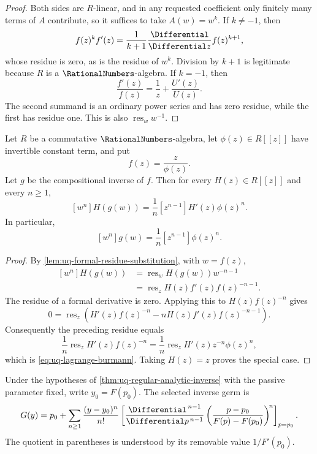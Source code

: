 \begin{proof}
Both sides are \(R\)-linear, and in any requested coefficient only finitely
many terms of \(A\) contribute, so it suffices to take \(A(w)=w^k\).
If \(k\ne-1\), then
\[
 f(z)^kf'(z)=\frac1{k+1}\frac{\Differential}{\Differential z}f(z)^{k+1},
\]
whose residue is zero, as is the residue of \(w^k\).  Division by \(k+1\)
is legitimate because \(R\) is a \(\RationalNumbers\)-algebra.  If \(k=-1\), then
\[
 \frac{f'(z)}{f(z)}=\frac1z+\frac{U'(z)}{U(z)}.
\]
The second summand is an ordinary power series and has zero residue, while
the first has residue one.  This is also
\(\operatorname{res}_w w^{-1}\).
\end{proof}

\begin{theorem}
\label{thm:uq-formal-lagrange-burmann}
Let \(R\) be a commutative \(\RationalNumbers\)-algebra, let
\(\phi(z)\in R[[z]]\) have invertible constant term, and put
\[
 f(z)=\frac{z}{\phi(z)}.
\]
Let \(g\) be the compositional inverse of \(f\).  Then for every
\(H(z)\in R[[z]]\) and every \(n\ge1\),
\begin{equation}
\label{eq:uq-lagrange-burmann}
 [w^n]H(g(w))
 =\frac1n[z^{n-1}]H'(z)\phi(z)^n.
\end{equation}
In particular,
\[
 [w^n]g(w)=\frac1n[z^{n-1}]\phi(z)^n.
\]
\end{theorem}

\begin{proof}
By \cref{lem:uq-formal-residue-substitution}, with \(w=f(z)\),
\[
\begin{aligned}
 [w^n]H(g(w))
 &=\operatorname{res}_w H(g(w))w^{-n-1}\\
 &=\operatorname{res}_z H(z)f'(z)f(z)^{-n-1}.
\end{aligned}
\]
The residue of a formal derivative is zero.  Applying this to
\(H(z)f(z)^{-n}\) gives
\[
 0=\operatorname{res}_z\!\left(
 H'(z)f(z)^{-n}-nH(z)f'(z)f(z)^{-n-1}\right).
\]
Consequently the preceding residue equals
\[
 \frac1n\operatorname{res}_z H'(z)f(z)^{-n}
 =\frac1n\operatorname{res}_z
 H'(z)z^{-n}\phi(z)^n,
\]
which is \eqref{eq:uq-lagrange-burmann}.  Taking \(H(z)=z\) proves the
special case.
\end{proof}

\begin{theorem}
\label{thm:uq-analytic-lagrange}
Under the hypotheses of \cref{thm:uq-regular-analytic-inverse} with the
passive parameter fixed, write \(y_0=F(p_0)\).  The selected inverse germ is
\[
 G(y)=p_0+\sum_{n\ge1}\frac{(y-y_0)^n}{n!}
 \left[
 \frac{\Differential^{\,n-1}}{\Differential p^{\,n-1}}
 \left(\frac{p-p_0}{F(p)-F(p_0)}\right)^{\!n}
 \right]_{p=p_0}.
\]
The quotient in parentheses is understood by its removable value
\(1/F'(p_0)\).
\end{theorem}


